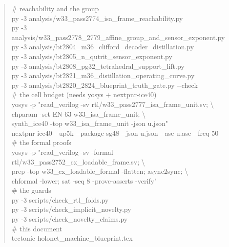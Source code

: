 \begin{spec}
\begin{quote}\ttfamily\small
\# reachability and the group\\
py -3 analysis/w33\_pass2774\_isa\_frame\_reachability.py\\
py -3 analysis/w33\_pass2778\_2779\_affine\_group\_and\_sensor\_exponent.py\\
py -3 analysis/bt2804\_m36\_clifford\_decoder\_distillation.py\\
py -3 analysis/bt2805\_n\_qutrit\_sensor\_exponent.py\\
py -3 analysis/bt2808\_pg32\_tetrahedral\_support\_lift.py\\
py -3 analysis/bt2821\_m36\_distillation\_operating\_curve.py\\
py -3 analysis/bt2820\_2824\_blueprint\_truth\_gate.py -{}-check\\[4pt]
\# the cell budget (needs yosys + nextpnr-ice40)\\
yosys -p "read\_verilog -sv rtl/w33\_pass2777\_isa\_frame\_unit.sv; \textbackslash\\
\hspace*{1em}chparam -set EN 63 w33\_isa\_frame\_unit; \textbackslash\\
\hspace*{1em}synth\_ice40 -top w33\_isa\_frame\_unit -json u.json"\\
nextpnr-ice40 -{}-up5k -{}-package sg48 -{}-json u.json -{}-asc u.asc -{}-freq 50\\[4pt]
\# the formal proofs\\
yosys -p "read\_verilog -sv -formal rtl/w33\_pass2752\_cx\_loadable\_frame.sv; \textbackslash\\
\hspace*{1em}prep -top w33\_cx\_loadable\_formal -flatten; async2sync; \textbackslash\\
\hspace*{1em}chformal -lower; sat -seq 8 -prove-asserts -verify"\\[4pt]
\# the guards\\
py -3 scripts/check\_rtl\_folds.py\\
py -3 scripts/check\_implicit\_novelty.py\\
py -3 scripts/check\_novelty\_claims.py\\[4pt]
\# this document\\
tectonic holonet\_machine\_blueprint.tex
\end{quote}
\end{spec}

